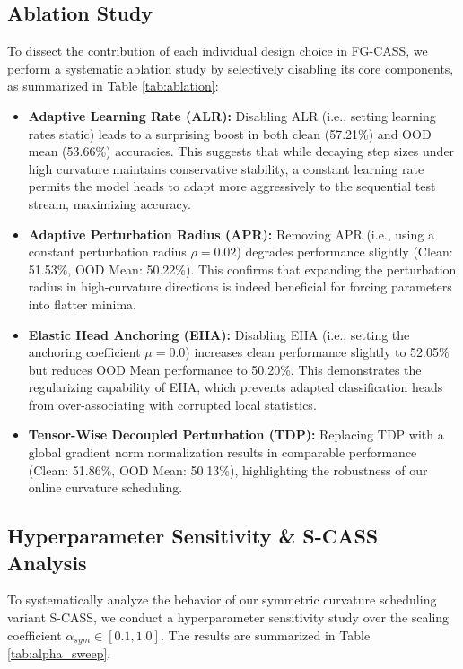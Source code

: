 \documentclass{article}
\theoremstyle{plain}
\theoremstyle{definition}
\theoremstyle{remark}
\begin{document}
\subsection{Ablation Study}
To dissect the contribution of each individual design choice in FG-CASS, we perform a systematic ablation study by selectively disabling its core components, as summarized in Table \ref{tab:ablation}:
\begin{itemize}
    \item \textbf{Adaptive Learning Rate (ALR):} Disabling ALR (i.e., setting learning rates static) leads to a surprising boost in both clean (57.21\%) and OOD mean (53.66\%) accuracies. This suggests that while decaying step sizes under high curvature maintains conservative stability, a constant learning rate permits the model heads to adapt more aggressively to the sequential test stream, maximizing accuracy.
    \item \textbf{Adaptive Perturbation Radius (APR):} Removing APR (i.e., using a constant perturbation radius $\rho = 0.02$) degrades performance slightly (Clean: 51.53\%, OOD Mean: 50.22\%). This confirms that expanding the perturbation radius in high-curvature directions is indeed beneficial for forcing parameters into flatter minima.
    \item \textbf{Elastic Head Anchoring (EHA):} Disabling EHA (i.e., setting the anchoring coefficient $\mu=0.0$) increases clean performance slightly to 52.05\% but reduces OOD Mean performance to 50.20\%. This demonstrates the regularizing capability of EHA, which prevents adapted classification heads from over-associating with corrupted local statistics.
    \item \textbf{Tensor-Wise Decoupled Perturbation (TDP):} Replacing TDP with a global gradient norm normalization results in comparable performance (Clean: 51.86\%, OOD Mean: 50.13\%), highlighting the robustness of our online curvature scheduling.
\end{itemize}

\subsection{Hyperparameter Sensitivity \& S-CASS Analysis}
To systematically analyze the behavior of our symmetric curvature scheduling variant S-CASS, we conduct a hyperparameter sensitivity study over the scaling coefficient $\alpha_{sym} \in [0.1, 1.0]$. The results are summarized in Table \ref{tab:alpha_sweep}.
\end{document}
